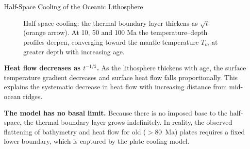 \begin{activity}{Half-Space Cooling of the Oceanic Lithosphere}
{{\begin{figure}[h]
\caption{Half-space cooling: the thermal boundary layer thickens as $\sqrt{t}$ (orange arrow). At 10, 50 and 100 Ma the temperature--depth profiles deepen, converging toward the mantle temperature $T_m$ at greater depth with increasing age.}
\end{figure}
}

\textbf{Heat flow decreases as $t^{-1/2}$.} As the lithosphere thickens with age, the surface temperature gradient decreases and surface heat flow falls proportionally. This explains the systematic decrease in heat flow with increasing distance from mid-ocean ridges.

\textbf{The model has no basal limit.} Because there is no imposed base to the half-space, the thermal boundary layer grows indefinitely. In reality, the observed flattening of bathymetry and heat flow for old (${>}80$~Ma) plates requires a fixed lower boundary, which is captured by the plate cooling model.
}

\end{activity}
